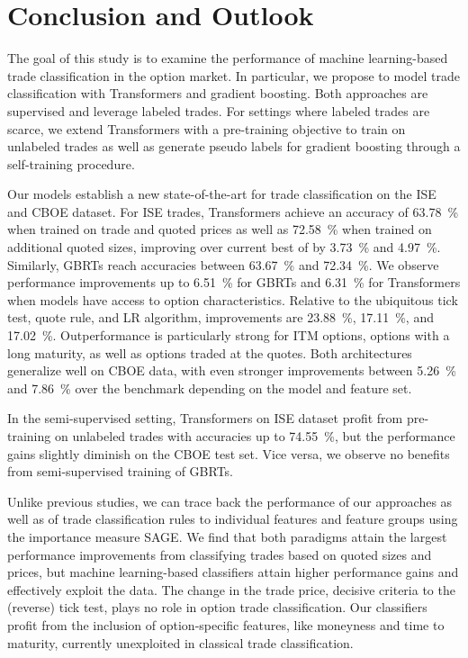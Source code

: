 \section{Conclusion and Outlook}\label{sec:conclusion-outlook}

The goal of this study is to examine the performance of machine learning-based trade classification in the option market. In particular, we propose to model trade classification with Transformers and gradient boosting. Both approaches are supervised and leverage labeled trades. For settings where labeled trades are scarce, we extend Transformers with a pre-training objective to train on unlabeled trades as well as generate pseudo labels for gradient boosting through a self-training procedure.

Our models establish a new state-of-the-art for trade classification on the \gls{ISE} and \gls{CBOE} dataset. For \gls{ISE} trades, Transformers achieve an accuracy of \SI{63.78}{\percent} when trained on trade and quoted prices as well as \SI{72.58}{\percent} when trained on additional quoted sizes, improving over current best of \textcite[][15]{grauerOptionTradeClassification2022} by \SI{3.73}{\percent} and \SI{4.97}{\percent}. Similarly, \glspl{GBRT} reach accuracies between \SI{63.67}{\percent} and \SI{72.34}{\percent}. We observe performance improvements up to \SI{6.51}{\percent} for \glspl{GBRT} and \SI{6.31}{\percent} for Transformers when models have access to option characteristics. Relative to the ubiquitous tick test, quote rule, and \gls{LR} algorithm, improvements are \SI{23.88}{\percent}, \SI{17.11}{\percent}, and \SI{17.02}{\percent}. Outperformance is particularly strong for \gls{ITM} options, options with a long maturity, as well as options traded at the quotes. Both architectures generalize well on \gls{CBOE} data, with even stronger improvements between \SI{5.26}{\percent} and \SI{7.86}{\percent} over the benchmark depending on the model and feature set. 

In the semi-supervised setting, Transformers on \gls{ISE} dataset profit from pre-training on unlabeled trades with accuracies up to \SI{74.55}{\percent}, but the performance gains slightly diminish on the \gls{CBOE} test set. Vice versa, we observe no benefits from semi-supervised training of \glspl{GBRT}.

Unlike previous studies, we can trace back the performance of our approaches as well as of trade classification rules to individual features and feature groups using the importance measure \gls{SAGE}. We find that both paradigms attain the largest performance improvements from classifying trades based on quoted sizes and prices, but machine learning-based classifiers attain higher performance gains and effectively exploit the data. The change in the trade price, decisive criteria to the (reverse) tick test, plays no role in option trade classification. Our classifiers profit from the inclusion of option-specific features, like moneyness and time to maturity, currently unexploited in classical trade classification.


